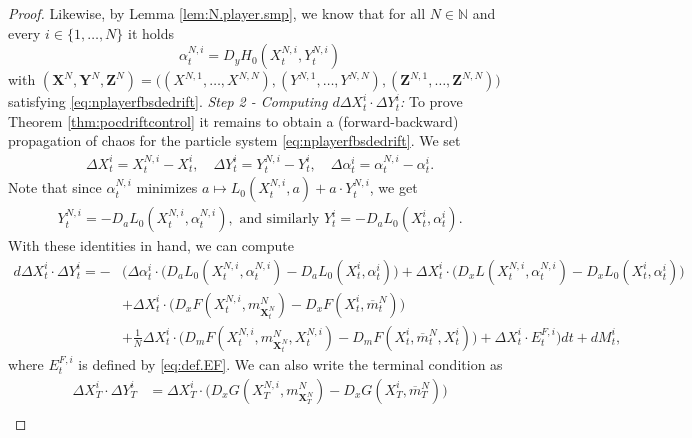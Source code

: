 \documentclass[11pt,reqno]{amsart}
\numberwithin{equation}{section}
\theoremstyle{definition}
\def\N{{\mathbb N}}
\newcommand{\bX}{\mathbf{X}}
\newcommand{\bY}{\mathbf{Y}}
\newcommand{\bZ}{\mathbf{Z}}
\newcommand{\ov}{\overline}
\newcommand\cF{\mathcal F}
\newcommand\cL{\mathcal L}
\def \N{\mathbb{N}}
\begin{document}
\begin{proof}
Likewise, by Lemma \ref{lem:N.player.smp}, we know that for all $N\in \N$ and every $i \in \{1, \dots, N\}$ it holds
\begin{equation*}
  \alpha^{N,i}_t = D_yH_0(X^{N,i}_t, Y^{N,i}_t)
\end{equation*}
with $(\bX^N, \bY^N, \bZ^N) = \big( (X^{N,1},\dots,X^{N,N}), (Y^{N,1},\dots,Y^{N,N}), (\bZ^{N,1},\dots,\bZ^{N,N})\big)$
satisfying \eqref{eq:nplayerfbsdedrift}. 
\newline \newline \noindent 
\textit{Step 2 - Computing $d \Delta X_t^i \cdot \Delta Y_t^i$:} To prove Theorem \ref{thm:pocdriftcontrol} it remains to obtain a (forward-backward) propagation of chaos for the particle system \eqref{eq:nplayerfbsdedrift}. We set
\begin{align*}
\Delta X_t^i = X_t^{N,i} - X_t^i, \quad \Delta Y_t^i = Y_t^{N,i} - Y_t^i, \quad \Delta \alpha_t^i = \alpha_t^{N,i} - \alpha_t^i.
\end{align*}
Note that since $\alpha_t^{N,i}$ minimizes $a \mapsto  L_0(X_t^{N,i}, a) + a \cdot Y_t^{N,i}$, we get
\begin{align*}
Y_t^{N,i} = - D_a L_0(X_t^{N,i}, \alpha_t^{N,i}), \text{ and similarly }
Y_t^i = - D_a L_0(X_t^i, \alpha_t^i).  
\end{align*}
With these identities in hand, we can compute
\begin{align} \label{xydynamics}
  d \Delta X_t^i \cdot \Delta Y_t^i = - &\bigg(\Delta \alpha^i_t \cdot  \big(D_a L_0(X_t^{N,i}, \alpha_t^{N,i}) - D_a L_0(X_t^i, \alpha_t^i) \big) + \Delta X_t^i \cdot \big(D_x L(X_t^{N,i}, \alpha_t^{N,i}) - D_x L_0(X_t^i, \alpha_t^i) \big) \nonumber \\
  &+ \Delta X_t^i \cdot \big(D_x F(X_t^{N,i}, m_{\bX_t^N}^N) - D_x F(X_t^i, \ov{m}_t^N)\big) & \nonumber  \\
  &+ \frac{1}{N} \Delta X_t^i \cdot \big(D_m F(X_t^{N,i}, m_{\bX_t^N}^N, X_t^{N,i}) - D_m F(X_t^{i}, \ov{m}_t^N, X_t^{i})  \big) + \Delta X_t^i \cdot E_t^{F,i} \bigg) dt + dM_t^i, 
\end{align}
where $E_t^{F,i}$ is defined by \eqref{eq:def.EF}.
We can also write the terminal condition as
\begin{align*}
  \Delta X_T^i \cdot \Delta Y_T^i &= \Delta X_T^{i} \cdot \big(D_x G(X_T^{N,i}, m_{\bX_T^N}^N) - D_x G(X_T^i, \ov{m}_T^N) \big) \\

\end{align*}
\end{proof}
\end{document}
